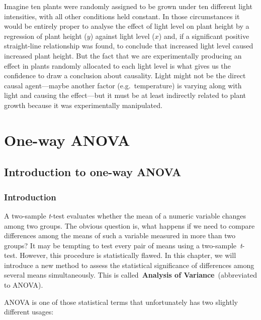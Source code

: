 \documentclass[
]{book}
\begin{document}
Imagine ten plants were randomly assigned to be grown under ten different light intensities, with all other conditions held constant. In those circumstances it would be entirely proper to analyse the effect of light level on plant height by a regression of plant height (\(y\)) against light level (\(x\)) and, if a significant positive straight-line relationship was found, to conclude that increased light level caused increased plant height. But the fact that we are experimentally producing an effect in plants randomly allocated to each light level is what gives us the confidence to draw a conclusion about causality. Light might not be the direct causal agent---maybe another factor (e.g.~temperature) is varying along with light and causing the effect---but it must be at least indirectly related to plant growth because it was experimentally manipulated.

\hypertarget{part-one-way-anova}{%
\part{One-way ANOVA}\label{part-one-way-anova}}

\hypertarget{introduction-to-one-way-anova}{%
\chapter{Introduction to one-way ANOVA}\label{introduction-to-one-way-anova}}

\hypertarget{intro}{%
\section{Introduction}\label{intro}}

A two-sample \emph{t}-test evaluates whether the mean of a numeric variable changes among two groups. The obvious question is, what happens if we need to compare differences among the means of such a variable measured in more than two groups? It may be tempting to test every pair of means using a two-sample~\emph{t}-test. However, this procedure is statistically flawed. In this chapter, we will introduce a new method to assess the statistical significance of differences among several means simultaneously. This is called~\textbf{Analysis of Variance}~(abbreviated to ANOVA).

ANOVA is one of those statistical terms that unfortunately has two slightly different usages:
\end{document}
